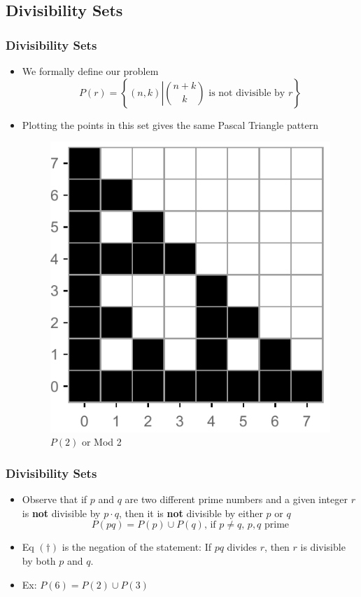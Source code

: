 \documentclass{beamer}
\begin{document}
\subsection{Divisibility Sets}
\begin{frame}
    \frametitle{Divisibility Sets}
    \begin{itemize}
        \item We formally define our problem
        \begin{equation*}
            P(r) = \left\{ (n,k) \left| \binom{n+k}{k} \text{ is not divisible by }r \right. \right\}
        \end{equation*}
        \item Plotting the points in this set gives the same Pascal Triangle pattern
        \begin{figure}
            \centering
            \includegraphics[scale = 0.5]{P(2)}
            \caption{$P(2)$ or Mod 2}
        \end{figure}
    \end{itemize}
\end{frame}

\begin{frame}
    \frametitle{Divisibility Sets}
    \begin{itemize}
        \item Observe that if $p$ and $q$ are two different prime numbers and a given integer $r$ is \textbf{not} divisible by $p \cdot q$, then it is \textbf{not} divisible by either $p$ or $q$
        \begin{equation*}
            P(pq) = P(p) \cup P(q) \text{, if $p \neq q$, $p,q$ prime} \tag{$\dagger$}
        \end{equation*}
        \item Eq $(\dagger)$ is the negation of the statement: If $pq$ divides $r$, then $r$ is divisible by both $p$ and $q$.
        \item Ex: $P(6) = P(2) \cup P(3)$ %
    \end{itemize}
\end{frame}
\end{document}
